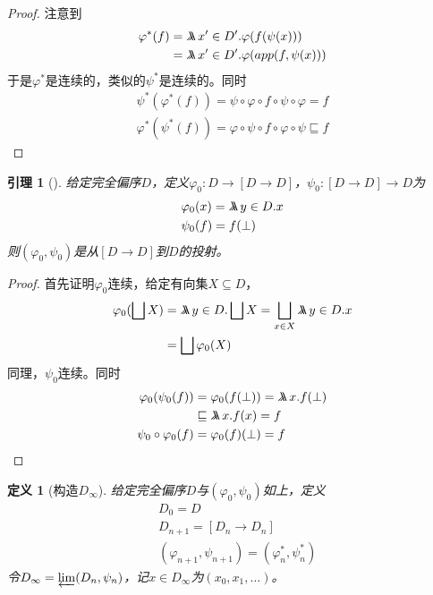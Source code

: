 \documentclass[11pt]{article}
\newtheorem{lemma}[theorem]{引理}
\newtheorem{definition}[theorem]{定义}
\begin{document}
\begin{proof}
注意到
\begin{align*}
\varphi^*(f)&=\metalambda x'\in D'.\varphi(f(\psi(x)))\\
&=\metalambda x'\in D'.\varphi(app(f,\psi(x)))
\end{align*}
于是\(\varphi^*\)是连续的，类似的\(\psi^*\)是连续的。同时
\begin{gather*}
\psi^*(\varphi^*(f))=\psi\circ\varphi\circ f\circ\psi\circ\varphi=f\\
\varphi^*(\psi^*(f))=\varphi\circ\psi\circ f\circ\varphi\circ\psi\sqsubseteq f
\end{gather*}
\end{proof}

\begin{lemma}[]
给定完全偏序\(D\)，定义\(\varphi_0:D\to[D\to D]\)，\(\psi_0:[D\to D]\to D\)为
\begin{align*}
&\varphi_0(x)=\metalambda y\in D.x\\
&\psi_0(f)=f(\bot)
\end{align*}
则\((\varphi_0,\psi_0)\)是从\([D\to D]\)到\(D\)的投射。
\end{lemma}

\begin{proof}
首先证明\(\varphi_0\)连续，给定有向集\(X\subseteq D\)，
\begin{align*}
\varphi_0(\bigsqcup X)&=\metalambda y\in D.\bigsqcup X=\bigsqcup_{x\in X}\metalambda y\in D.x\\
&=\bigsqcup\varphi_0(X)
\end{align*}
同理，\(\psi_0\)连续。同时
\begin{align*}
\varphi_0(\psi_0(f))&=\varphi_0(f(\bot))=\metalambda x.f(\bot)\\
&\sqsubseteq\metalambda x.f(x)=f\\
\psi_0\circ\varphi_0(f)&=\varphi_0(f)(\bot)=f
\end{align*}
\end{proof}

\begin{definition}[构造\(D_\infty\)]
给定完全偏序\(D\)与\((\varphi_0,\psi_0)\)如上，定义
\begin{align*}
&D_0=D\\
&D_{n+1}=[D_n\to D_n]\\
&(\varphi_{n+1},\psi_{n+1})=(\varphi_n^*,\psi_n^*)
\end{align*}
令\(D_\infty=\varprojlim(D_n,\psi_n)\)，记\(x\in D_\infty\)为\((x_0,x_1,\dots)\)。
\end{definition}
\end{document}
